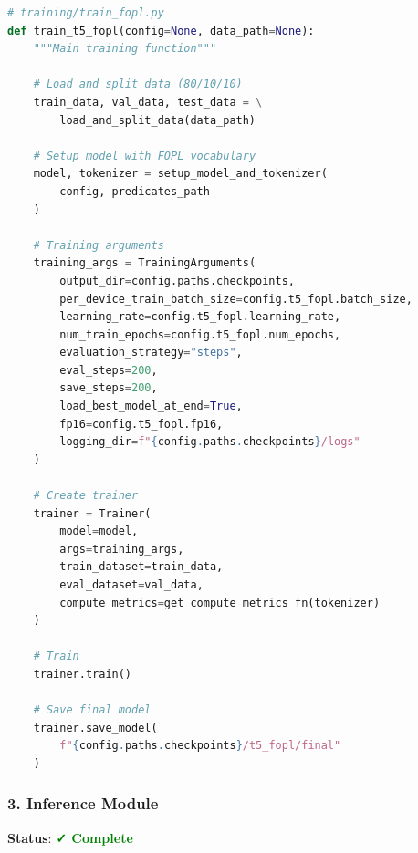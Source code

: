 \documentclass[12pt,a4paper]{article}
\begin{document}
\begin{lstlisting}[language=Python, caption=Training Pipeline Core]
# training/train_fopl.py
def train_t5_fopl(config=None, data_path=None):
    """Main training function"""
    
    # Load and split data (80/10/10)
    train_data, val_data, test_data = \
        load_and_split_data(data_path)
    
    # Setup model with FOPL vocabulary
    model, tokenizer = setup_model_and_tokenizer(
        config, predicates_path
    )
    
    # Training arguments
    training_args = TrainingArguments(
        output_dir=config.paths.checkpoints,
        per_device_train_batch_size=config.t5_fopl.batch_size,
        learning_rate=config.t5_fopl.learning_rate,
        num_train_epochs=config.t5_fopl.num_epochs,
        evaluation_strategy="steps",
        eval_steps=200,
        save_steps=200,
        load_best_model_at_end=True,
        fp16=config.t5_fopl.fp16,
        logging_dir=f"{config.paths.checkpoints}/logs"
    )
    
    # Create trainer
    trainer = Trainer(
        model=model,
        args=training_args,
        train_dataset=train_data,
        eval_dataset=val_data,
        compute_metrics=get_compute_metrics_fn(tokenizer)
    )
    
    # Train
    trainer.train()
    
    # Save final model
    trainer.save_model(
        f"{config.paths.checkpoints}/t5_fopl/final"
    )
\end{lstlisting}

\subsubsection{3. Inference Module}

\textbf{Status}: \textcolor{green}{\textbf{✓ Complete}}
\end{document}
